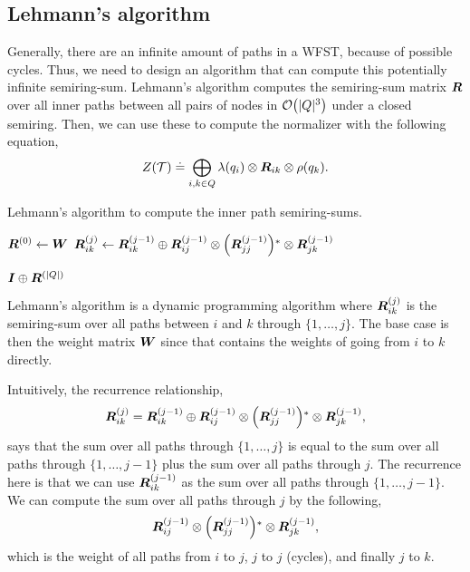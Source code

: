 \subsection{Lehmann's algorithm}

Generally, there are an infinite amount of paths in a WFST, because of possible
cycles. Thus, we need to design an algorithm that can compute this potentially
infinite semiring-sum. Lehmann's algorithm \citep{lehmann1977algebraic}
computes the semiring-sum matrix $\bm{R}$ over all inner paths between all
pairs of nodes in $\bigo{|Q|^3}$ under a closed semiring. Then, we can use
these to compute the normalizer with the following equation, \[
  Z(\mathcal{T}) \doteq \bigoplus_{i,k \in Q} \lambda(q_i) \otimes \bm{R}_{ik} \otimes \rho(q_k)
.\]

\begin{algorithm}
  \caption{Lehmann's algorithm to compute the inner path semiring-sums.}
  \label{alg:lehmann}

  \begin{algorithmic}[1]
      \State $\bm{R}^{(0)} \gets \bm{W}$
            \State $\mat{R}_{ik}^{(j)} \gets \mat{R}_{ik}^{(j-1)} \oplus \mat{R}_{ij}^{(j-1)} \otimes \lft( \mat{R}_{jj}^{(j-1)} \rgt)^* \otimes \mat{R}_{jk}^{(j-1)}$
          \EndFor
        \EndFor
      \EndFor

      \State \Return $\bm{I} \oplus \bm{R}^{(|Q|)}$
    \EndFunction
  \end{algorithmic}
\end{algorithm}

Lehmann's algorithm is a dynamic programming algorithm where
$\bm{R}_{ik}^{(j)}$ is the semiring-sum over all paths between $i$ and $k$
through $\{ 1,\ldots, j \}$. The base case is then the weight matrix $\bm{W}$
since that contains the weights of going from $i$ to $k$ directly.

Intuitively, the recurrence relationship, \[
  \mat{R}_{ik}^{(j)} = \mat{R}_{ik}^{(j-1)} \oplus \mat{R}_{ij}^{(j-1)} \otimes \lft( \mat{R}_{jj}^{(j-1)} \rgt)^* \otimes \mat{R}_{jk}^{(j-1)}
,\]
says that the sum over all paths through $\{ 1,\ldots,j \}$ is equal to the sum
over all paths through $\{ 1,\ldots,j-1 \}$ plus the sum over all paths through
$j$. The recurrence here is that we can use $\bm{R}_{ik}^{(j-1)}$ as the sum
over all paths through $\{ 1,\ldots,j-1 \}$. We can compute the sum over all
paths through $j$ by the following, \[
  \mat{R}_{ij}^{(j-1)} \otimes \lft( \mat{R}_{jj}^{(j-1)} \rgt)^* \otimes \mat{R}_{jk}^{(j-1)}
,\]
which is the weight of all paths from $i$ to $j$, $j$ to $j$ (cycles), and
finally $j$ to $k$.


